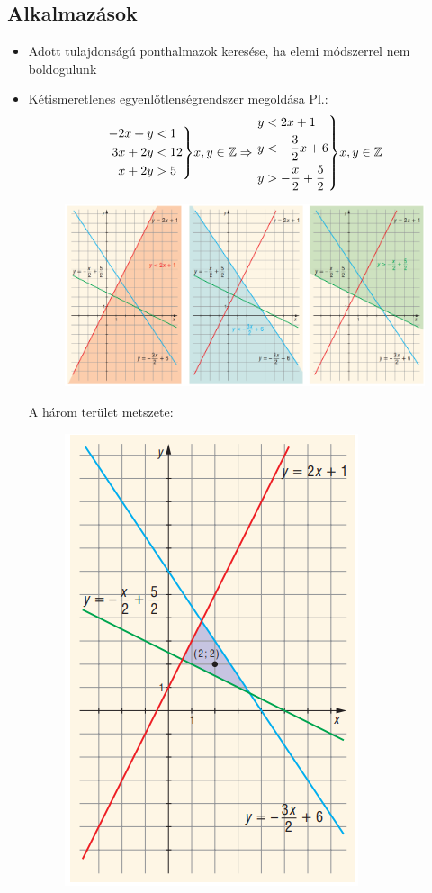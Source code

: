 \documentclass[12pt,a4paper]{article}
\newenvironment{rcases}
  {\left.\begin{aligned}}
  {\end{aligned}\right\rbrace}
\begin{document}
\subsection{Alkalmazások}
\begin{itemize}
\item Adott tulajdonságú ponthalmazok keresése, ha elemi módszerrel nem boldogulunk
\item Kétismeretlenes egyenlőtlenségrendszer megoldása
Pl.:
\[
\begin{rcases}
-2x+y&<1 \\
3x+2y&<12 \\
x+2y&>5
\end{rcases} x,y\in \mathbb{Z} \Rightarrow 
\begin{rcases}
y&<2x+1 \\
y&<-\dfrac{3}{2}x+6 \\
y&>-\dfrac{x}{2}+\dfrac{5}{2}
\end{rcases} x,y\in \mathbb{Z}
\]

\begin{figure}[h!]
\centering
\includegraphics[width=\textwidth]{geometry/egyenletrendszer}
\end{figure}

\newpage
A három terület metszete:
\begin{figure}[h!]
\centering
\includegraphics[scale=0.4]{geometry/metszet}
\end{figure}


\end{itemize}
\end{document}
